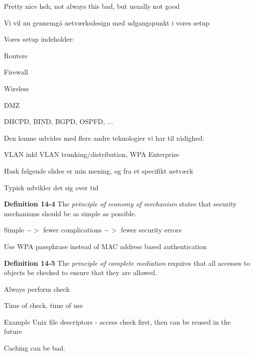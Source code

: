 \documentclass[Screen16to9,17pt]{foils}
\begin{document}


\centerline{Pretty nice heh, not always this bad, but usually not good}


\begin{list1}
\item Vi vil nu gennemgå netværksdesign med udgangspunkt i vores setup
\item Vores setup indeholder:
\begin{list2}
\item Routere
\item Firewall
\item Wireless
\item DMZ
\item DHCPD, BIND, BGPD, OSPFD, ...
\end{list2}
\item Den kunne udvides med flere andre teknologier vi har til rådighed:
\begin{list2}
\item VLAN inkl VLAN trunking/distribution, WPA Enterprise
\end{list2}
\item Husk følgende slides er min mening, og fra et specifikt netværk
\item Typisk udvikler det sig over tid
\end{list1}



\begin{list1}
\item {\bf Definition 14-4} The \emph{principle of economy of mechanism} states that security mechanisms should be as simple as possible.
\item Simple $->$ fewer complications $->$ fewer security errors
\item Use WPA passphrase instead of MAC address based authentication
\item
\end{list1}



\begin{list1}
\item {\bf Definition 14-5} The \emph{principle of complete mediation} requires that all accesses to objects be checked to ensure that they are allowed.
\item Always perform check
\item Time of check, time of use
\item Example Unix file descriptors - access check first, then can be reused in the future
\item Caching can be bad.
\end{list1}
\end{document}
